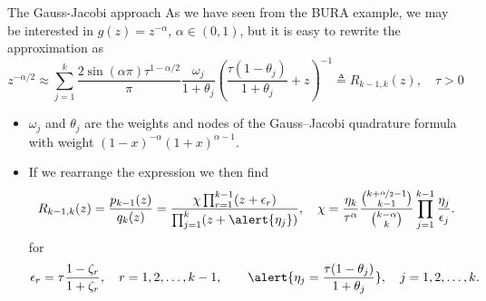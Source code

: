 \documentclass[aspectratio=169,xcolor=dvipsnames]{beamer}
\begin{document}
	\begin{frame}{The Gauss-Jacobi approach}
	As we have seen from the BURA example, we may be interested in $g(z) = z^{-\alpha}$, $\alpha \in (0,1)$, but it is easy to rewrite the approximation as
	\begin{equation*}
		z^{-\alpha/2} \approx \sum_{j=1}^{k} \frac{2\sin(\alpha\pi) \tau^{1-\alpha/2}}{\pi} \frac{\omega_j}{1+\theta_j} \left(\frac{\tau(1-\theta_j)}{1+\theta_j} +z\right)^{-1}  \triangleq R_{k-1,k}\left( z \right), \quad \tau > 0
	\end{equation*}
	\begin{itemize}
		\item[\faCog] $\omega_j$ and $\theta_j$ are the weights and
		nodes of the Gauss--Jacobi quadrature formula with weight
		$(1-x)^{-\alpha} (1+x)^{\alpha-1}$.
		\item[\faHammer] If we rearrange the expression we then find
	\begin{equation*}
		R_{k-1,k}(z) = \frac{p_{k-1}(z)}{q_k(z)} =\frac{\chi \prod_{r=1}^{k-1}(z+\epsilon_r)}{\prod_{j=1}^{k} (z+\alert{\eta_j})}, \quad \chi =
		\frac{\eta_k}{\tau^{\alpha}}
		\frac{\binom{k+\nicefrac{\alpha}{2}-1}{k-1}}{\binom{k-\alpha}{k}}
		\prod_{j=1}^{k-1} \frac{\eta_j}{\epsilon_j}.
	\end{equation*}
	for
	\begin{eqnarray*}
		\epsilon_r = \tau \frac{1- \zeta_r}{1+\zeta_r}, \quad r=1,2,\dots,k-1, \qquad
		\alert{\eta_j = \frac{\tau(1-\theta_j)}{1+\theta_j}}, \quad j=1,2,\dots,k.
	\end{eqnarray*}

	\end{itemize}

	\end{frame}
\end{document}
